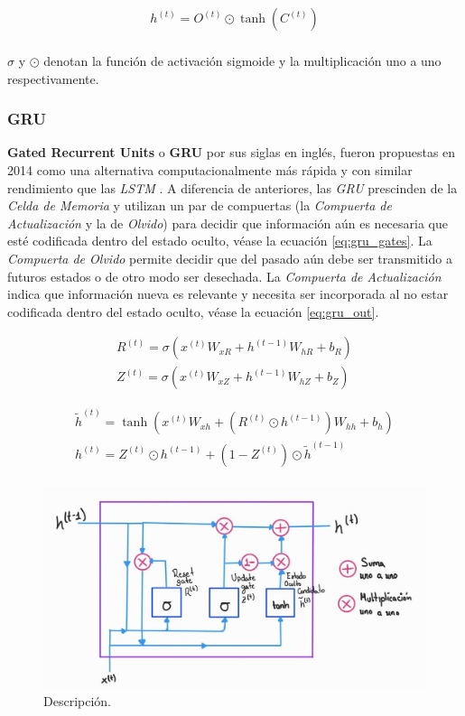 \begin{equation}
    \begin{split}
        h^{(t)} =  O^{(t)} \odot \tanh(C^{(t)}) \\
    \end{split}
\end{equation}

$\sigma$ y $\odot$ denotan la función de activación sigmoide y la multiplicación uno a uno
respectivamente.


\subsubsection{GRU}

\textbf{Gated Recurrent Units} o \textbf{GRU} por sus siglas en inglés, fueron propuestas en 2014
\cite{GRU1} como una alternativa computacionalmente más rápida y con similar rendimiento que las
\textit{LSTM} \cite{GRU2}. A diferencia de anteriores, las \textit{GRU} prescinden de la
\textit{Celda de Memoria} y utilizan un par de compuertas (la \textit{Compuerta de Actualización} y
la de \textit{Olvido}) para decidir que información aún es necesaria que esté codificada dentro del
estado oculto, véase la ecuación \ref{eq:gru_gates}.
La \textit{Compuerta de Olvido} permite decidir que del pasado aún debe ser transmitido a futuros
estados o de otro modo ser desechada. La \textit{Compuerta de Actualización} indica que información nueva es relevante y
necesita ser incorporada al no estar codificada dentro del estado oculto,
véase la ecuación \ref{eq:gru_out}.

\begin{equation}
    \begin{split}
        R^{(t)} = \sigma(x^{(t)} W_{xR} + h^{(t-1)} W_{hR} + b_R)\\
        Z^{(t)} = \sigma(x^{(t)} W_{xZ} + h^{(t-1)} W_{hZ} + b_Z)
    \end{split}
    \label{eq:gru_gates}
\end{equation}

\begin{equation}
    \begin{split}
        \tilde h^{(t)} = \tanh(x^{(t)} W_{xh} + ( R^{(t)} \odot h^{(t-1)}) W_{hh} + b_h)\\
        h^{(t)} =  Z^{(t)} \odot h^{(t-1)} + (1 - Z^{(t)}) \odot \tilde h^{(t-1)} \\
    \end{split}
    \label{eq:gru_out}
\end{equation}

\begin{figure}[ht!]
\centering
\includegraphics[width=1.0 \textwidth]{Chapters/2. Transformer/Figures/rnn/GRU.jpg}
\caption{Descripción.}
\label{fig:rnn_gru}
\end{figure}

